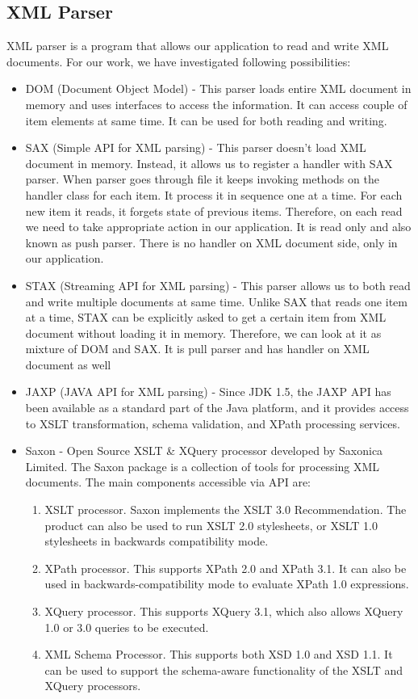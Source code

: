 \subsection{XML Parser}
XML parser is a program that allows our application to read and write XML documents. For our work, we have investigated following possibilities:
\begin{itemize}
	\item DOM (Document Object Model) - This parser loads entire XML document in memory and uses interfaces to access the information. It can access couple of item elements at same time. It can be used for both reading and writing.
	\item SAX (Simple API for XML parsing) - This parser doesn't load XML document in memory. Instead, it allows us to register a handler with SAX parser. When parser goes through file it keeps invoking methods on the handler class for each item. It process it in sequence one at a time. For each new item it reads, it forgets state of previous items. Therefore, on each read we need to take appropriate action in our application. It is read only and also known as push parser. There is no handler on XML document side, only in our application.
	\item STAX (Streaming API for XML parsing) - This parser allows us to both read and write multiple documents at same time. Unlike SAX that reads one item at a time, STAX can be explicitly asked to get a certain item from XML document without loading it in memory. Therefore, we can look at it as mixture of DOM and SAX. It is pull parser and has handler on XML document as well
	\item JAXP (JAVA API for XML parsing) - Since JDK 1.5, the JAXP API has been available as a standard part of the Java platform, and it provides access to XSLT transformation, schema validation, and XPath processing services.
	\item Saxon \cite{Saxon} - Open Source XSLT \& XQuery processor developed by Saxonica Limited. The Saxon package is a collection of tools for processing XML documents. The main components accessible via API are:
	\begin{enumerate}
		\item XSLT processor. Saxon implements the XSLT 3.0 Recommendation. The product can also be used to run XSLT 2.0 stylesheets, or XSLT 1.0 stylesheets in backwards compatibility mode.
		\item XPath processor. This supports XPath 2.0 and XPath 3.1. It can also be used in backwards-compatibility mode to evaluate XPath 1.0 expressions.
		\item XQuery processor. This supports XQuery 3.1, which also allows XQuery 1.0 or 3.0 queries to be executed. 
		\item XML Schema Processor. This supports both XSD 1.0 and XSD 1.1. It can be used to support the schema-aware functionality of the XSLT and XQuery processors.
	\end{enumerate}
\end{itemize}

